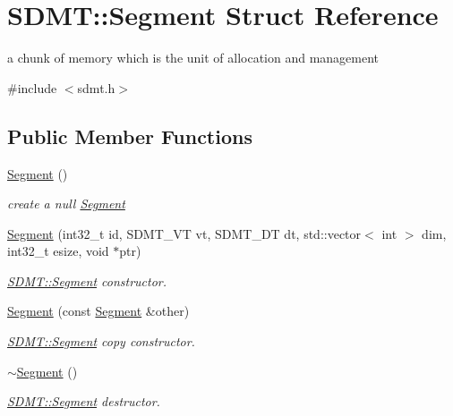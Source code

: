 \hypertarget{struct_s_d_m_t_1_1_segment}{}\section{S\+D\+MT\+:\+:Segment Struct Reference}
\label{struct_s_d_m_t_1_1_segment}


a chunk of memory which is the unit of allocation and management  




{\ttfamily \#include $<$sdmt.\+h$>$}

\subsection*{Public Member Functions}
\begin{DoxyCompactItemize}
\item 
\mbox{\label{struct_s_d_m_t_1_1_segment_a0f4b0aa7fa5596a96a84129f010f19b6}} 
\hyperlink{struct_s_d_m_t_1_1_segment_a0f4b0aa7fa5596a96a84129f010f19b6}{Segment} ()
\begin{DoxyCompactList}\small\item\em create a null \hyperlink{struct_s_d_m_t_1_1_segment}{Segment} \end{DoxyCompactList}\item 
\hyperlink{struct_s_d_m_t_1_1_segment_a386954456945a0bfb2634e6e3ae2b6a6}{Segment} (int32\+\_\+t id, S\+D\+M\+T\+\_\+\+VT vt, S\+D\+M\+T\+\_\+\+DT dt, std\+::vector$<$ int $>$ dim, int32\+\_\+t esize, void $\ast$ptr)
\begin{DoxyCompactList}\small\item\em \hyperlink{struct_s_d_m_t_1_1_segment}{S\+D\+M\+T\+::\+Segment} constructor. \end{DoxyCompactList}\item 
\hyperlink{struct_s_d_m_t_1_1_segment_a119578504b0ab9d498d506aea0a169f5}{Segment} (const \hyperlink{struct_s_d_m_t_1_1_segment}{Segment} \&other)
\begin{DoxyCompactList}\small\item\em \hyperlink{struct_s_d_m_t_1_1_segment}{S\+D\+M\+T\+::\+Segment} copy constructor. \end{DoxyCompactList}\item 
\mbox{\label{struct_s_d_m_t_1_1_segment_a9da129d3aacb44861d18c2e97986aa55}} 
\hyperlink{struct_s_d_m_t_1_1_segment_a9da129d3aacb44861d18c2e97986aa55}{$\sim$\+Segment} ()
\begin{DoxyCompactList}\small\item\em \hyperlink{struct_s_d_m_t_1_1_segment}{S\+D\+M\+T\+::\+Segment} destructor. \end{DoxyCompactList}\end{DoxyCompactItemize}
